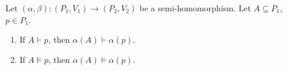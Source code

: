 Let $(\alpha, \beta) : (P_1, V_1) \rightarrow (P_2, V_2)$ be a semi-homomorphism. Let $A \subseteq P_1$, $p \in P_1$.

\begin{enumerate}
\item[(a)] If $A \vdash p$, then $\alpha(A) \vdash \alpha(p)$.
\item[(b)] If $A \vDash p$, then $\alpha(A) \vDash \alpha(p)$.
\end{enumerate}
